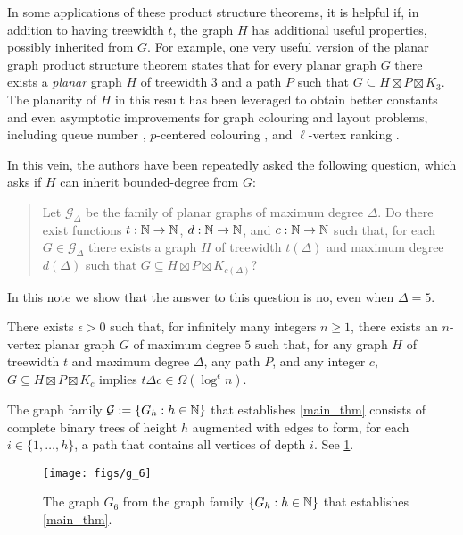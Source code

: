 \documentclass{patmorin}
\renewcommand{\ge}{\geqslant}
\begin{document}
In some applications of these product structure theorems, it is helpful if, in addition to having treewidth $t$, the graph $H$ has additional useful properties, possibly inherited from $G$.  For example, one very useful version of the planar graph product structure theorem states that for every planar graph $G$ there exists a \emph{planar} graph $H$ of treewidth $3$ and a path $P$ such that $G\subseteq H\boxtimes P\boxtimes K_3$.  The planarity of $H$ in this result has been leveraged to obtain better constants and even asymptotic improvements for graph colouring and layout problems, including queue number \cite{dujmovic.joret.ea:planar}, $p$-centered colouring \cite{debski.felsner.ea:improved}, and $\ell$-vertex ranking \cite{bose.dujmovic.ea:asymptotically}.

In this vein, the authors have been repeatedly asked the following question, which asks if $H$ can inherit bounded-degree from $G$:
\begin{quote}
  Let $\mathcal{G}_\Delta$ be the family of planar graphs of maximum degree $\Delta$.  Do there exist functions $t:\mathbb{N}\to\mathbb{N}$, $d:\mathbb{N}\to\mathbb{N}$, and $c:\mathbb{N}\to\mathbb{N}$ such that, for each $G\in\mathcal{G}_\Delta$ there exists a graph $H$ of treewidth $t(\Delta)$ and maximum degree $d(\Delta)$ such that $G\subseteq H\boxtimes P\boxtimes K_{c(\Delta)}$?
\end{quote}
In this note we show that the answer to this question is no, even when $\Delta=5$.

\begin{thm}\label{main_thm}
  There exists $\epsilon > 0$ such that, for infinitely many integers $n\ge 1$, there exists an $n$-vertex planar graph $G$ of maximum degree $5$ such that, for any graph $H$ of treewidth $t$ and maximum degree $\Delta$, any path $P$, and any integer $c$, $G\subseteq H\boxtimes P\boxtimes K_c$ implies $t\Delta c\in\Omega(\log^\epsilon n)$.
\end{thm}

The graph family $\mathcal{G}:=\{G_h:h\in\mathbb{N}\}$ that establishes \cref{main_thm} consists of complete binary trees of height $h$ augmented with edges to form, for each $i\in\{1,\ldots,h\}$, a path that contains all vertices of depth $i$.  See \cref{g_6}.

\begin{figure}
  \begin{center}
    \texttt{[image: figs/g\_6]}
  \end{center}
  \caption{The graph $G_6$ from the graph family $\{G_h:h\in\mathbb{N}\}$ that establishes \cref{main_thm}.}
  \label{g_6}
\end{figure}
\end{document}
